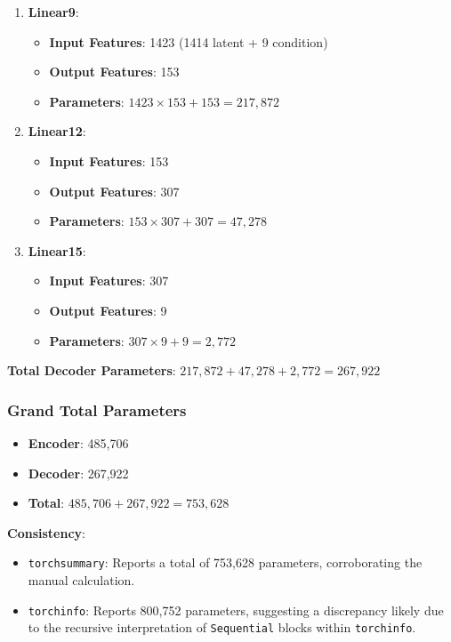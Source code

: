 \documentclass[10pt]{article}
\begin{document}
\begin{enumerate}
    \item \textbf{Linear9}:
    \begin{itemize}
        \item \textbf{Input Features}: 1423 (1414 latent + 9 condition)
        \item \textbf{Output Features}: 153
        \item \textbf{Parameters}: \( 1423 \times 153 + 153 = 217,872 \)
    \end{itemize}
    
    \item \textbf{Linear12}:
    \begin{itemize}
        \item \textbf{Input Features}: 153
        \item \textbf{Output Features}: 307
        \item \textbf{Parameters}: \( 153 \times 307 + 307 = 47,278 \)
    \end{itemize}
    
    \item \textbf{Linear15}:
    \begin{itemize}
        \item \textbf{Input Features}: 307
        \item \textbf{Output Features}: 9
        \item \textbf{Parameters}: \( 307 \times 9 + 9 = 2,772 \)
    \end{itemize}
\end{enumerate}

\textbf{Total Decoder Parameters}: \( 217,872 + 47,278 + 2,772 = 267,922 \)

\subsubsection{Grand Total Parameters}

\begin{itemize}
    \item \textbf{Encoder}: 485,706
    \item \textbf{Decoder}: 267,922
    \item \textbf{Total}: \( 485,706 + 267,922 = 753,628 \)
\end{itemize}

\textbf{Consistency}:

\begin{itemize}
    \item \texttt{torchsummary}: Reports a total of 753,628 parameters, corroborating the manual calculation.
    \item \texttt{torchinfo}: Reports 800,752 parameters, suggesting a discrepancy likely due to the recursive interpretation of \texttt{Sequential} blocks within \texttt{torchinfo}.
\end{itemize}
\end{document}
